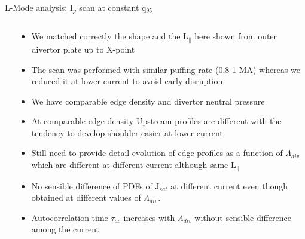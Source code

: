 \documentclass[10pt, compress]{beamer}
\newcommand\Fontvi{\fontsize{8}{7.2}\selectfont}
\begin{document}
\begin{frame}{L-Mode analysis: I$_p$ scan at constant q$_{95}$}
\Fontvi
  \vspace{-1cm}
\begin{columns}
  \begin{column}{0.65\textwidth}

  \end{column}
  \begin{column}{0.35\textwidth}
    \begin{itemize}
      \item<1|only@1> We matched correctly the shape and the L$_{\parallel}$
        here shown from outer divertor plate up to X-point 
      \item<2|only@2> The scan was performed with similar puffing rate (0.8-1
        MA) whereas we reduced it at lower current to avoid early disruption
      \item<2|only@2> We have comparable edge density and divertor neutral
        pressure 
      \item<3|only@3> At comparable edge density Upstream profiles are
        different with the tendency to develop shoulder easier at
        lower current
      \item<3|only@3> Still need to provide detail evolution of edge
        profiles as a function
        of $\Lambda_{div}$ which are different at different current
        although same L$_{\parallel}$
      \item<4|only@4> No sensible difference of PDFs of J$_{sat}$ at
        different current even though obtained at different values of $\Lambda_{div}$. 
      \item<4|only@4> Autocorrelation time $\tau_{ac}$ increases with
        $\Lambda_{div}$ without sensible difference among the current
      \end{itemize}
    \end{column}
\end{columns}
\end{frame}
\end{document}
